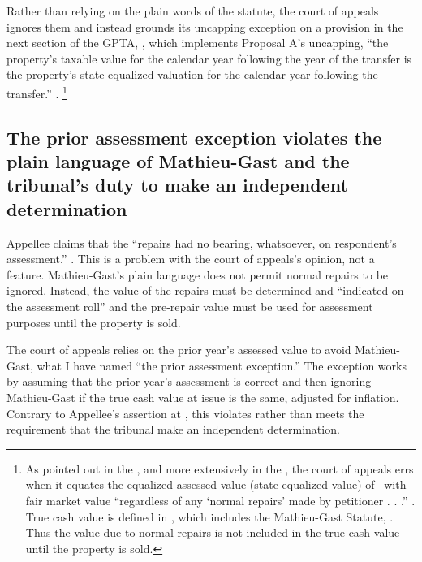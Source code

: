 \documentclass[12pt,\documentclassflag]{michiganCourtOfAppealsBrief}
\begin{document}
Rather than relying on the plain words of the statute, the court of appeals ignores them and instead grounds its uncapping exception on a provision in the next section of the GPTA, \cite{MCL 211.27a(3)}, which implements Proposal A's uncapping, ``the property’s taxable value for
the calendar year following the year of the transfer is the property’s state equalized valuation for
the calendar year following the transfer.'' .
\footnote{As pointed out in the , and more extensively in the , the court of appeals errs when it equates the equalized assessed value (state equalized value) of \cite{MCL 211.27a(3)}\ with fair market value ``regardless of any `normal repairs' made by petitioner . . .'' . True cash value is defined in \cite{MCL 211.27}, which includes the Mathieu-Gast Statute, \mathieuGast. Thus the value due to normal repairs is not included in the true cash value until the property is sold.}


\subsection{The prior assessment exception violates the plain language of Mathieu-Gast and the tribunal's duty to make an independent determination}

Appellee claims that the ``repairs had no bearing, whatsoever, on respondent's assessment.'' . This is a problem with the court of appeals's opinion, not a feature. Mathieu-Gast's plain language does not permit normal repairs to be ignored. Instead, the value of the repairs must be determined and ``indicated on the assessment roll'' and the pre-repair value must be used for assessment purposes until the property is sold.

The court of appeals relies on the prior year's assessed value to avoid Mathieu-Gast, what I have named ``the prior assessment exception.'' The exception works by assuming that the prior year's assessment is correct and then ignoring Mathieu-Gast if the true cash value at issue is the same, adjusted for inflation. Contrary to Appellee's assertion at , this violates rather than meets the requirement that the tribunal make an independent determination.
\end{document}

